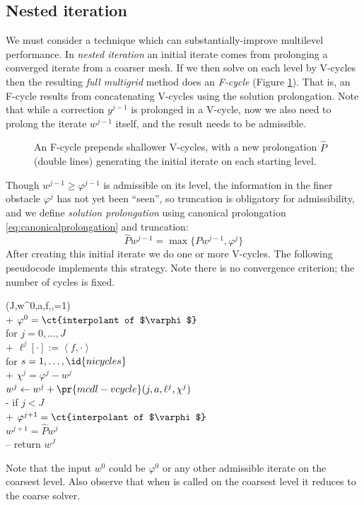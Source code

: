 \documentclass[letterpaper,final,12pt,reqno]{amsart}
\theoremstyle{claim}
\newcommand{\ip}[2]{\left<#1,#2\right>}
\numberwithin{equation}{section}
\numberwithin{figure}{section}
\numberwithin{table}{section}
\numberwithin{theorem}{section}
\begin{document}
\subsection{Nested iteration} \label{subsec:obstaclefcycles}  We must consider a technique which can substantially-improve multilevel performance.  In \emph{nested iteration} \cite{Trottenbergetal2001} an initial iterate comes from prolonging a converged iterate from a coarser mesh.  If we then solve on each level by V-cycles then the resulting \emph{full multigrid} method does an \emph{F-cycle} (Figure \ref{fig:fcycle}).  That is, an F-cycle results from concatenating V-cycles using the solution prolongation.  Note that while a correction $y^{j-1}$ is prolonged in a V-cycle, now we also need to prolong the iterate $w^{j-1}$ itself, and the result needs to be admissible.

\begin{figure}

\caption{An F-cycle prepends shallower V-cycles, with a new prolongation $\hat P$ (double lines) generating the initial iterate on each starting level.}
\label{fig:fcycle}
\end{figure}

Though $w^{j-1} \ge \varphi^{j-1}$ is admissible on its level, the information in the finer obstacle $\varphi^j$ has not yet been ``seen'', so truncation is obligatory for admissibility, and we define \emph{solution prolongation} using canonical prolongation \eqref{eq:canonicalprolongation} and truncation:
\begin{equation}
\hat P w^{j-1} = \max\{P w^{j-1}, \varphi^{j}\}  \label{eq:solutionprolongation}
\end{equation}
After creating this initial iterate we do one or more V-cycles.  The following pseudocode implements this strategy.  Note there is no convergence criterion; the number of cycles is fixed.
\begin{pseudo*} \label{ps:mcdl-fcycle}
(J,w^0,a,f,\varphi,=1)\text{:} \\+
    $\varphi^0 = \ct{interpolant of $\varphi$}$ \\
    for $j=0,\dots,J$ \\+
        $\ell^j[\cdot] := \ip{f}{\cdot}$ \\
        for $s=1,\dots,\id{nicycles}$ \qquad\qquad\qquad {} \\+
            $\chi^j = \varphi^j - w^j$ \\
            $w^j \gets w^j+\pr{mcdl-vcycle}(j,a,\ell^j,\chi^j)$ \\-
        if $j < J$ \\+
            $\varphi^{j+1} = \ct{interpolant of $\varphi$}$ \\
            $w^{j+1} = \hat P w^j$ \qquad\qquad\qquad\qquad {} \\--
    return $w^J$
\end{pseudo*}
Note that the input $w^0$ could be $\varphi^0$ or any other admissible iterate on the coarsest level.  Also observe that when  is called on the coarsest level it reduces to the coarse solver.
\end{document}
